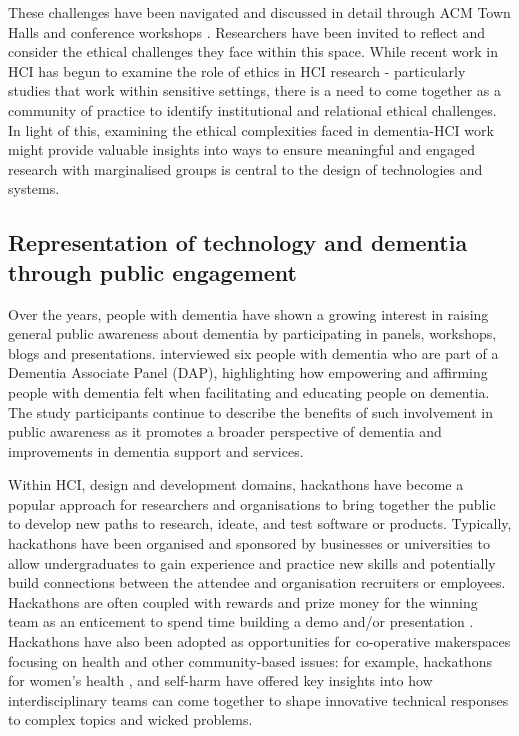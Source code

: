 These challenges have been navigated and discussed in detail through ACM Town Halls and conference workshops \cite{frauenberger_research_2017, munteanu_sigchi_2019}. Researchers have been invited to reflect and consider the ethical challenges they face within this space. While recent work in HCI has begun to examine the role of ethics in HCI research - particularly studies that work within sensitive settings, there is a need to come together as a community of practice to identify institutional and relational ethical challenges. In light of this, examining the ethical complexities faced in dementia-HCI work might provide valuable insights into ways to ensure meaningful and engaged research with marginalised groups is central to the design of technologies and systems.

\subsection{Representation of technology and dementia through public engagement}
\label{BL:gap:engagement}
Over the years, people with dementia have shown a growing interest in raising general public awareness about dementia by participating in panels, workshops, blogs and presentations. \cite{innes2021s} interviewed six people with dementia who are part of a Dementia Associate Panel (DAP), highlighting how empowering and affirming people with dementia felt when facilitating and educating people on dementia. The study participants continue to describe the benefits of such involvement in public awareness as it promotes a broader perspective of dementia and improvements in dementia support and services.

Within HCI, design and development domains, hackathons have become a popular approach for researchers and organisations to bring together the public to develop new paths to research, ideate, and test software or products. Typically, hackathons have been organised and sponsored by businesses or universities to allow undergraduates to gain experience and practice new skills and potentially build connections between the attendee and organisation recruiters or employees. Hackathons are often coupled with rewards and prize money for the winning team as an enticement to spend time building a demo and/or presentation \citep{johnson_civic_2014}. Hackathons have also been adopted as opportunities for co-operative makerspaces focusing on health and other community-based issues: for example, hackathons for women’s health \citep{paganini_engaging_2020}, and self-harm \citep{birbeck_self_2017} have offered key insights into how interdisciplinary teams can come together to shape innovative technical responses to complex topics and wicked problems. 

